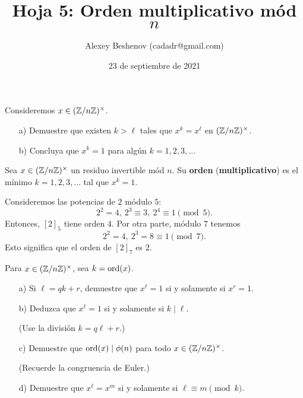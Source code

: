 \documentclass{article}
\title{Hoja 5: Orden multiplicativo mód $n$}
\author{Alexey Beshenov (cadadr@gmail.com)}
\date{23 de septiembre de 2021}
\begin{document}
\maketitle

\thispagestyle{empty}

\setcounter{section}{5}

\begin{problema}
  Consideremos $x \in (\mathbb{Z}/n\mathbb{Z})^\times$.

  \begin{enumerate}
  \item[a)] Demuestre que existen $k > \ell$ tales que $x^k = x^\ell$ en
    $(\mathbb{Z}/n\mathbb{Z})^\times$.

  \item[b)] Concluya que $x^k = 1$ para algún $k = 1,2,3,\ldots$
  \end{enumerate}
\end{problema}

\begin{definicion}
  Sea $x \in (\mathbb{Z}/n\mathbb{Z})^\times$ un residuo invertible mód $n$. Su \textbf{orden}
  (\textbf{multiplicativo}) es el mínimo $k = 1,2,3,\ldots$ tal que $x^k = 1$.
\end{definicion}

\begin{ejemplo}
  Consideremos las potencias de $2$ módulo $5$:
  \[
    2^2 = 4, ~
    2^3 \equiv 3, ~
    2^4 \equiv 1 \pmod{5}.
  \]
  Entonces, $[2]_5$ tiene orden $4$. Por otra parte, módulo $7$ tenemos
  \[
    2^2 = 4, ~
    2^3 = 8 \equiv 1 \pmod{7}.
  \]
  Esto significa que el orden de $[2]_7$ es $2$.
\end{ejemplo}

\begin{problema}
  Para $x \in (\mathbb{Z}/n\mathbb{Z})^\times$, sea $k = \operatorname{ord} (x)$.

  \begin{enumerate}
  \item[a)] Si $\ell = qk + r$, demuestre que $x^\ell = 1$ si y solamente si
    $x^r = 1$.

  \item[b)] Deduzca que $x^\ell = 1$ si y solamente si $k \mid \ell$.

    (Use la división $k = q\ell + r$.)

  \item[c)] Demuestre que $\operatorname{ord} (x) \mid \phi(n)$ para todo
    $x \in (\mathbb{Z}/n\mathbb{Z})^\times$.

    (Recuerde la congruencia de Euler.)

  \item[d)] Demuestre que $x^\ell = x^m$ si y solamente si
    $\ell \equiv m \pmod{k}$.
  \end{enumerate}
\end{problema}
\end{document}
